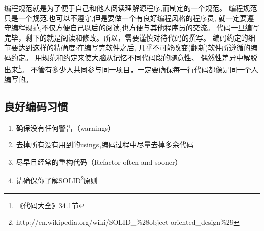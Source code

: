 \documentclass{book}
\begin{document}
编程规范就是为了便于自己和他人阅读理解源程序,而制定的一个规范。
编程规范只是一个规范,也可以不遵守,但是要做一个有良好编程风格的程序员,
就一定要遵守编程规范,不仅方便自己以后的阅读,也方便与其他程序员的交流。
代码一旦编写完毕，剩下的就是阅读和修改。所以，需要谨慎对待代码的撰写。
编码约定的细节要达到这样的精确度:在编写完软件之后,
几乎不可能改变(翻新)软件所遵循的编码约定。
用规范和约定来使大脑从记忆不同代码段的随意性、
偶然性差异中解脱出来\footnote{《代码大全》34.1节}。
不管有多少人共同参与同一项目，一定要确保每一行代码都像是同一个人编写的。

\subsection{良好编码习惯}

\begin{enumerate}
\setcounter{enumi}{0}
\item{确保没有任何警告（warnings）}
\item{去掉所有没有用到的usings,编码过程中尽量去掉多余代码}
\item{尽早且经常的重构代码（Refactor often and sooner）}
\item{请确保你了解SOLID\footnote{http://en.wikipedia.org/wiki/SOLID\_\%28object-oriented\_design\%29}原则}


\end{enumerate}
\end{document}
